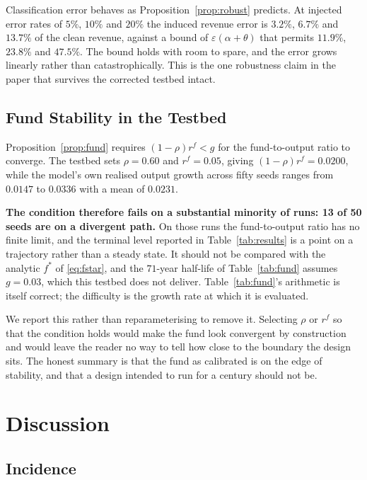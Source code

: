 \documentclass[journal]{IEEEtran}
\theoremstyle{plain}
\theoremstyle{definition}
\begin{document}
Classification error behaves as Proposition~\ref{prop:robust} predicts. At
injected error rates of $5\%$, $10\%$ and $20\%$ the induced revenue error is
$3.2\%$, $6.7\%$ and $13.7\%$ of the clean revenue, against a bound of
$\varepsilon(\alpha+\theta)$ that permits $11.9\%$, $23.8\%$ and $47.5\%$. The
bound holds with room to spare, and the error grows linearly rather than
catastrophically. This is the one robustness claim in the paper that survives
the corrected testbed intact.


\subsection{Fund Stability in the Testbed}
\label{sec:fundstability}

Proposition~\ref{prop:fund} requires $(1-\rho)r^{f} < g$ for the fund-to-output
ratio to converge. The testbed sets $\rho = 0.60$ and $r^{f} = 0.05$, giving
$(1-\rho)r^{f} = 0.0200$, while the model's own realised output growth across
fifty seeds ranges from $0.0147$ to $0.0336$ with a mean of $0.0231$.

\textbf{The condition therefore fails on a substantial minority of runs: 13 of
50 seeds are on a divergent path.} On those runs the fund-to-output ratio has no
finite limit, and the terminal level reported in Table~\ref{tab:results} is a
point on a trajectory rather than a steady state. It should not be compared
with the analytic $f^{*}$ of \eqref{eq:fstar}, and the $71$-year half-life of
Table~\ref{tab:fund} assumes $g = 0.03$, which this testbed does not deliver.
Table~\ref{tab:fund}'s arithmetic is itself correct; the difficulty is the
growth rate at which it is evaluated.

We report this rather than reparameterising to remove it. Selecting $\rho$ or
$r^{f}$ so that the condition holds would make the fund look convergent by
construction and would leave the reader no way to tell how close to the boundary
the design sits. The honest summary is that the fund as calibrated is on the
edge of stability, and that a design intended to run for a century should not
be.

\section{Discussion}
\label{sec:discussion}

\subsection{Incidence}
\end{document}
